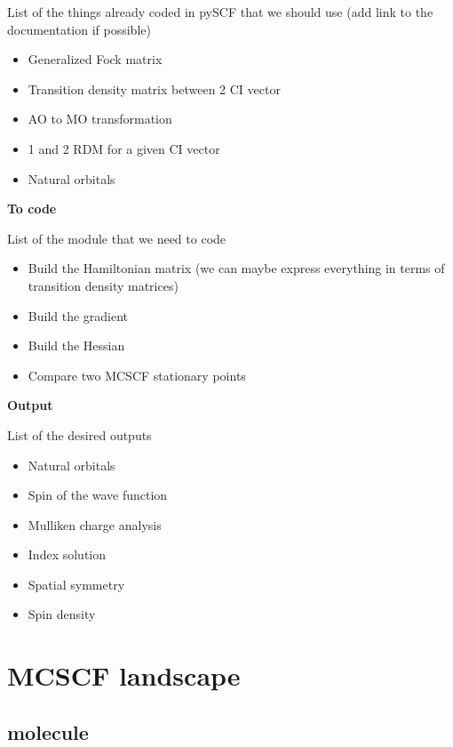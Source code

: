 \documentclass[11pt,a4paper]{article}
\begin{document}
List of the things already coded in pySCF that we should use (add link to the documentation if possible)
\begin{itemize}
\item Generalized Fock matrix
\item Transition density matrix between 2 CI vector
\item AO to MO transformation
\item 1 and 2 RDM for a given CI vector
\item Natural orbitals
\end{itemize}

\noindent\textbf{To code}

List of the module that we need to code
\begin{itemize}
\item Build the Hamiltonian matrix (we can maybe express everything in terms of transition density matrices)
\item Build the gradient
\item Build the Hessian
\item Compare two MCSCF stationary points
\end{itemize}

\noindent\textbf{Output}

List of the desired outputs
\begin{itemize}
\item Natural orbitals
\item Spin of the wave function
\item Mulliken charge analysis
\item Index solution
\item Spatial symmetry
\item Spin density
\end{itemize}

\section{MCSCF landscape}
\label{sec:MCSCFland}

\subsection{ molecule}
\end{document}
